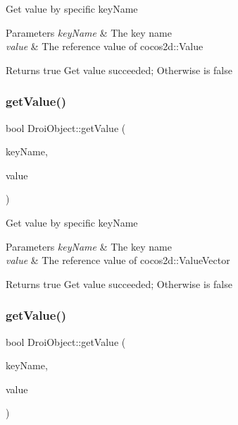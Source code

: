 Get value by specific key\+Name 
\begin{DoxyParams}{Parameters}
{\em key\+Name} & The key name \\
\hline
{\em value} & The reference value of cocos2d\+::\+Value \\
\hline
\end{DoxyParams}
\begin{DoxyReturn}{Returns}
true Get value succeeded; Otherwise is false 
\end{DoxyReturn}
\mbox{\label{class_droi_object_a4ed4dfbafbe38cd1c1ef5125c8db9c29}} 
\subsubsection{\texorpdfstring{get\+Value()}{getValue()}\hspace{0.1cm}{\footnotesize\ttfamily [6/11]}}
{\footnotesize\ttfamily bool Droi\+Object\+::get\+Value (\begin{DoxyParamCaption}\item[{const string \&}]{key\+Name,  }\item[{cocos2d\+::\+Value\+Vector \&}]{value }\end{DoxyParamCaption})}

Get value by specific key\+Name 
\begin{DoxyParams}{Parameters}
{\em key\+Name} & The key name \\
\hline
{\em value} & The reference value of cocos2d\+::\+Value\+Vector \\
\hline
\end{DoxyParams}
\begin{DoxyReturn}{Returns}
true Get value succeeded; Otherwise is false 
\end{DoxyReturn}
\mbox{\label{class_droi_object_a048d3bc941c78e44dd6e389f2c6c2236}} 
\subsubsection{\texorpdfstring{get\+Value()}{getValue()}\hspace{0.1cm}{\footnotesize\ttfamily [7/11]}}
{\footnotesize\ttfamily bool Droi\+Object\+::get\+Value (\begin{DoxyParamCaption}\item[{const string \&}]{key\+Name,  }\item[{cocos2d\+::\+Value\+Map \&}]{value }\end{DoxyParamCaption})}

